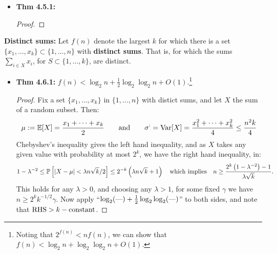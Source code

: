 \documentclass[11pt]{article}
\newenvironment{INT}[1][]{\begin{itemize}\small\item\textbf{#1}}{\end{itemize}}
\begin{document}
\begin{chapter4}
\begin{itemise}
\begin{INT}[Thm 4.5.1:]
\begin{proof}
\end{proof}
\end{INT}
\item \textbf{Distinct sums:} Let $f(n)$ denote the largest $k$ for which there is a set $\{x_1,\ldots,x_k\}\subset\{1,\ldots,n\}$ with \textbf{distinct sums}. That is, for which the sums $\sum_{i\in X}x_i$, for $S\subset\{1,\ldots,k\}$, are distinct.
\begin{INT}[Thm 4.6.1:]
$f(n)<\log_2n+\frac{1}{2}\log_2\log_2n+O(1)$.\footnote{Noting that $2^{f(n)}<nf(n)$, we can show that $f(n)<\log_2n+\log_2\log_2n+O(1)$.}
\begin{proof}
Fix a set $\{x_1,\ldots,x_k\}$ in $\{1,\ldots,n\}$ with distict sums, and let $X$ the sum of a random subset. Then:
\[\mu:=\operatorname{\mathbb{E}}[X]=\frac{x_1+\cdots+x_k}{2}\textup{\qquad and\qquad}\sigma^:=\operatorname{Var}[X]=\frac{x_1^2+\cdots+x_k^2}{4}\leq\frac{n^2k}{4}\]
Chebyshev's inequality gives the left hand inequality, and as $X$ takes any given value with probability at most $2^k$, we have the right hand inequality, in:
\[1-\lambda^{-2}\leq
\operatorname{\mathbb{P}}\left[|X-\mu|<\lambda n\sqrt{k}/2\right]\leq
2^{-k}\left(\lambda n\sqrt{k}+1\right)\textup{\quad which implies\quad }
n\geq\frac{2^k\left(1-\lambda^{-2}\right)-1}{\lambda\sqrt k}.\]
This holds for any $\lambda>0$, and choosing any $\lambda>1$, for some fixed $\gamma$ we have $n\geq 2^kk^{-1/2}\gamma$. Now apply ``$\log_2(\textup{---})+\frac{1}{2}\log_2\log_2(\textup{---})$'' to both sides, and note that $\textup{RHS}>k-\textup{constant}$.
\end{proof}

\end{INT}
\end{itemise}


\end{chapter4}
\end{document}
